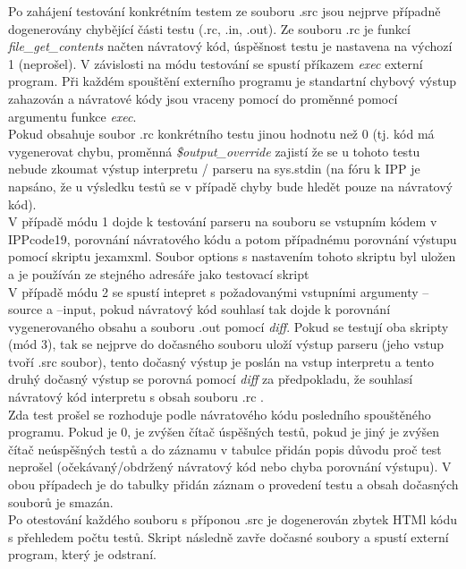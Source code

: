 \documentclass[10pt]{article}
\begin{document}
Po zahájení testování konkrétním testem ze souboru .src jsou nejprve případně dogenerovány chybějící části testu (.rc, .in, .out). Ze souboru .rc je funkcí  \textit{file\_get\_contents} načten návratový kód, úspěšnost testu je nastavena na výchozí 1 (neprošel). V závislosti na módu testování se spustí příkazem \textit{exec} externí program. Při každém spouštění externího programu je standartní chybový výstup zahazován a návratové kódy jsou vraceny pomocí do proměnné pomocí argumentu funkce \textit{exec}.\\
Pokud obsahuje soubor .rc konkrétního testu jinou hodnotu než 0 (tj. kód má vygenerovat chybu, proměnná \textit{\$output\_override} zajistí že se u tohoto testu nebude zkoumat výstup interpretu / parseru na sys.stdin (na fóru k IPP je napsáno, že u výsledku testů se v případě chyby bude hledět pouze na návratový kód).
\\V případě módu 1 dojde k testování parseru na souboru se vstupním kódem v IPPcode19, porovnání návratového kódu a potom případnému porovnání výstupu pomocí skriptu jexamxml. Soubor options s nastavením tohoto skriptu byl uložen a je používán ze stejného adresáře jako testovací skript\\V případě módu 2 se spustí intepret s požadovanými vstupními argumenty --source a --input, pokud návratový kód souhlasí tak dojde k porovnání vygenerovaného obsahu a souboru .out pomocí \textit{diff}. Pokud se testují oba skripty (mód 3), tak se nejprve do dočasného souboru uloží výstup parseru (jeho vstup tvoří .src soubor), tento dočasný výstup je poslán na vstup interpretu a tento druhý dočasný výstup se porovná pomocí \textit{diff} za předpokladu, že souhlasí návratový kód interpretu s obsah souboru .rc .\\
Zda test prošel se rozhoduje podle návratového kódu posledního spouštěného programu. Pokud je 0, je zvýšen čítač úspěšných testů, pokud je jiný je zvýšen čítač neúspěšných testů a do záznamu v tabulce přidán popis důvodu proč test neprošel (očekávaný/obdržený návratový kód nebo chyba porovnání výstupu). V obou případech je do tabulky přidán záznam o provedení testu a obsah dočasných souborů je smazán.\\
Po otestování každého souboru s příponou .src je dogenerován zbytek HTMl kódu s přehledem počtu testů. Skript následně zavře dočasné soubory a spustí externí program, který je odstraní.
\end{document}
